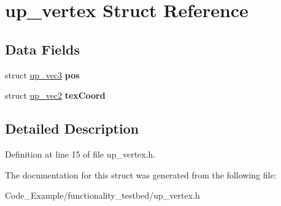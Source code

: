 \hypertarget{structup__vertex}{}\section{up\+\_\+vertex Struct Reference}
\label{structup__vertex}
\subsection*{Data Fields}
\begin{DoxyCompactItemize}
\item 
\hypertarget{structup__vertex_ad5e9d1040f4ef4fbe488b7078c16ee97}{}struct \hyperlink{structup__vec3}{up\+\_\+vec3} {\bfseries pos}\label{structup__vertex_ad5e9d1040f4ef4fbe488b7078c16ee97}

\item 
\hypertarget{structup__vertex_a2ac14ec0c569045da8d9c3e7d92bfacd}{}struct \hyperlink{structup__vec2}{up\+\_\+vec2} {\bfseries tex\+Coord}\label{structup__vertex_a2ac14ec0c569045da8d9c3e7d92bfacd}

\end{DoxyCompactItemize}


\subsection{Detailed Description}


Definition at line 15 of file up\+\_\+vertex.\+h.



The documentation for this struct was generated from the following file\+:\begin{DoxyCompactItemize}
\item 
Code\+\_\+\+Example/functionality\+\_\+testbed/up\+\_\+vertex.\+h\end{DoxyCompactItemize}
